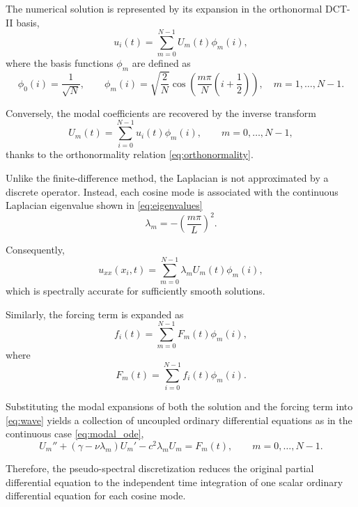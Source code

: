 \documentclass{Configuration_Files/PoliMi3i_thesis}
\begin{document}
The numerical solution is represented by its expansion in the orthonormal DCT-II basis,
\begin{equation*}
u_i(t)
=
\sum_{m=0}^{N-1}
U_m(t)\phi_m(i),
\end{equation*}
where the basis functions $\phi_m$ are defined as
\begin{equation}
\label{eq:dct_basis}
\phi_0(i) = \frac1{\sqrt N}, \qquad
\phi_m(i) = \sqrt{\frac2N} \cos\!\left(\frac{m\pi}{N}\left(i+\frac12\right)\right), \quad m=1,\ldots,N-1.
\end{equation}

Conversely, the modal coefficients are recovered by the inverse transform
\begin{equation*}
U_m(t)
=
\sum_{i=0}^{N-1}
u_i(t)\phi_m(i),
\qquad
m=0,\ldots,N-1,
\end{equation*}
thanks to the orthonormality relation \eqref{eq:orthonormality}.

Unlike the finite-difference method, the Laplacian is not approximated by a discrete operator. Instead, each cosine mode is associated with the continuous Laplacian eigenvalue shown in \eqref{eq:eigenvalues}
\begin{equation*}
\lambda_m
=
-\left(\frac{m\pi}{L}\right)^2.
\end{equation*}

Consequently,
\begin{equation*}
u_{xx}(x_i,t)
=
\sum_{m=0}^{N-1}
\lambda_m
U_m(t)
\phi_m(i),
\end{equation*}
which is spectrally accurate for sufficiently smooth solutions.

Similarly, the forcing term is expanded as
\begin{equation*}
f_i(t)
=
\sum_{m=0}^{N-1}
F_m(t)\phi_m(i),
\end{equation*}
where
\begin{equation*}
F_m(t)
=
\sum_{i=0}^{N-1}
f_i(t)\phi_m(i).
\end{equation*}

Substituting the modal expansions of both the solution and the forcing term into \eqref{eq:wave} yields a collection of uncoupled ordinary differential equations as in the continuous case \eqref{eq:modal_ode},
\begin{equation*}
U_m''
+
\left(
\gamma
-
\nu\lambda_m
\right)
U_m'
-
c^2\lambda_mU_m
=
F_m(t),
\qquad
m=0,\ldots,N-1.
\end{equation*}

Therefore, the pseudo-spectral discretization reduces the original partial differential equation to the independent time integration of one scalar ordinary differential equation for each cosine mode.
\end{document}
